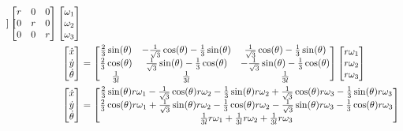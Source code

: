 \documentclass{article}
\begin{document}
\begin{align}
\begin{bmatrix}
		\end{bmatrix}
		\begin{bmatrix}
			r & 0 & 0 \\
			0 & r & 0 \\
			0 & 0 & r
		\end{bmatrix}
	    \begin{bmatrix}
	       \omega_{1} \\
	       \omega_{2} \\
	       \omega_{3} \\
	    \end{bmatrix} \\
	\begin{bmatrix}
		\dot{x} \\
		\dot{y} \\
		\dot{\theta}
	\end{bmatrix} 
		&=
		\begin{bmatrix}
			\frac{2}{3} \sin(\theta) 
				& -\frac{1}{\sqrt{3}} \cos(\theta) 
					-\frac{1}{3} \sin(\theta)
				& \frac{1}{\sqrt{3}} \cos(\theta) 
					-\frac{1}{3} \sin(\theta) \\
			\frac{2}{3} \cos(\theta)
				& \frac{1}{\sqrt{3}} \sin(\theta) 
					-\frac{1}{3} \cos(\theta)
				& -\frac{1}{\sqrt{3}} \sin(\theta) 
					-\frac{1}{3} \cos(\theta) \\
			\frac{1}{3l} 
				& \frac{1}{3l}
				& \frac{1}{3l}
		\end{bmatrix}
		\begin{bmatrix}
			r \omega_{1} \\
			r \omega_{2} \\
			r \omega_{3} \\
		\end{bmatrix} \\
	\begin{bmatrix}
		\dot{x} \\
		\dot{y} \\
		\dot{\theta}
	\end{bmatrix} 
		&=
		\begin{bmatrix}
			\frac{2}{3} \sin(\theta) r \omega_{1}
				- \frac{1}{\sqrt{3}} \cos(\theta) r \omega_{2}
					- \frac{1}{3} \sin(\theta) r \omega_{2}
				+ \frac{1}{\sqrt{3}} \cos(\theta) r \omega_{3}
					- \frac{1}{3} \sin(\theta) r \omega_{3} \\
			\frac{2}{3} \cos(\theta) r \omega_{1}
				+ \frac{1}{\sqrt{3}} \sin(\theta) r \omega_{2}
					-\frac{1}{3} \cos(\theta)r \omega_{2}
				- \frac{1}{\sqrt{3}} \sin(\theta) r \omega_{3}
					-\frac{1}{3} \cos(\theta) r \omega_{3} \\
			\frac{1}{3l} r \omega_{1}
				+ \frac{1}{3l} r \omega_{2}
				+ \frac{1}{3l} r \omega_{3}
		\end{bmatrix} \\
	\vspace{-0.4cm}
\end{align}
\end{document}
